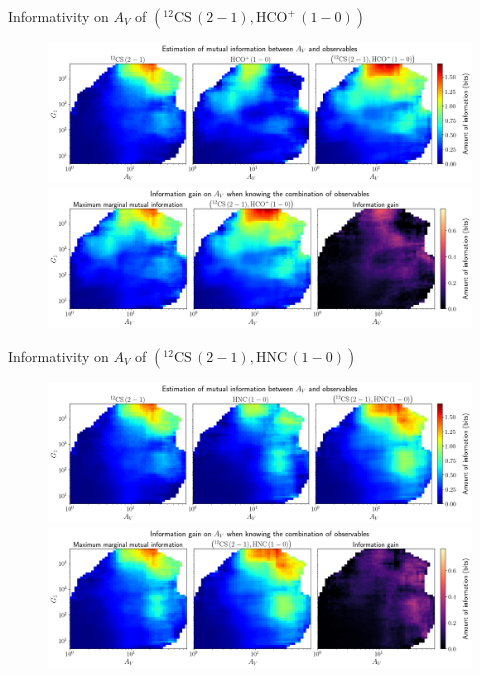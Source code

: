\documentclass{beamer}
\begin{document}
\begin{frame}{Informativity on $A_V$ of $\left(\mathrm{^{12}CS\,(2-1)},\mathrm{HCO^+\,(1-0)}\right)$}
    \begin{figure}
        \centering
        \includegraphics[width=0.95\linewidth]{../mi/av__12cs21_hcop10_mi.png}
        \vfill
        \includegraphics[width=0.95\linewidth]{../mi/av__12cs21_hcop10_mi_gain.png}
    \end{figure}
\end{frame}

\begin{frame}{Informativity on $A_V$ of $\left(\mathrm{^{12}CS\,(2-1)},\mathrm{HNC\,(1-0)}\right)$}
    \begin{figure}
        \centering
        \includegraphics[width=0.95\linewidth]{../mi/av__12cs21_hnc10_mi.png}
        \vfill
        \includegraphics[width=0.95\linewidth]{../mi/av__12cs21_hnc10_mi_gain.png}
    \end{figure}
\end{frame}
\end{document}
